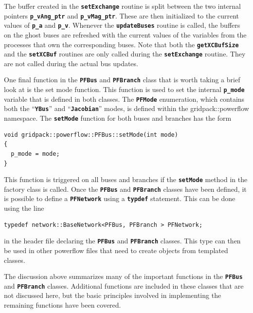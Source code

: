 \documentclass[12pt]{report} %
\begin{document}
The buffer created in the \texttt{\textbf{setExchange}} routine is split between the two internal pointers \texttt{\textbf{p\_vAng\_ptr}} and \texttt{\textbf{p\_vMag\_ptr}}. These are then initialized to the current values of \texttt{\textbf{p\_a}} and \texttt{\textbf{p\_v}}. Whenever the \texttt{\textbf{updateBuses}} routine is called, the buffers on the ghost buses are refreshed with the current values of the variables from the processes that own the corresponding buses. Note that both the \texttt{\textbf{getXCBufSize}} and the \texttt{\textbf{setXCBuf}} routines are only called during the \texttt{\textbf{setExchange}} routine. They are not called during the actual bus updates.

One final function in the \texttt{\textbf{PFBus}} and \texttt{\textbf{PFBranch}} class that is worth taking a brief look at is the set mode function. This function is used to set the internal \texttt{\textbf{p\_mode}} variable that is defined in both classes. The \texttt{\textbf{PFMode}} enumeration, which contains both the ``\texttt{\textbf{YBus}}'' and ``\texttt{\textbf{Jacobian}}'' modes, is defined within the gridpack::powerflow namespace. The \texttt{\textbf{setMode}} function for both buses and branches has the form

{
\color{red}
\begin{Verbatim}[fontseries=b]
void gridpack::powerflow::PFBus::setMode(int mode)
{
  p_mode = mode;
}
\end{Verbatim}
}

This function is triggered on all buses and branches if the \texttt{\textbf{setMode}} method in the factory class is called.
Once the \texttt{\textbf{PFBus}} and \texttt{\textbf{PFBranch}} classes have been defined, it is possible to define a \texttt{\textbf{PFNetwork}} using a \texttt{\textbf{typdef}} statement. This can be done using the line

{
\color{red}
\begin{Verbatim}[fontseries=b]
typedef network::BaseNetwork<PFBus, PFBranch > PFNetwork;
\end{Verbatim}
}

in the header file declaring the \texttt{\textbf{PFBus}} and \texttt{\textbf{PFBranch}} classes. This type can then be used in other powerflow files that need to create objects from templated classes.

The discussion above summarizes many of the important functions in the \texttt{\textbf{PFBus}} and \texttt{\textbf{PFBranch}} classes. Additional functions are included in these classes that are not discussed here, but the basic principles involved in implementing the remaining functions have been covered. 
\end{document}
